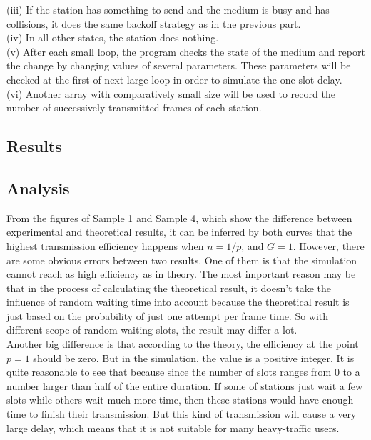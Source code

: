 \documentclass[11pt,a4paper]{report}
\begin{document}
(iii) If the station has something to send and the medium is busy and has collisions, it does the same backoff strategy as in the previous part. \\

(iv) In all other states, the station does nothing. \\

(v) After each small loop, the program checks the state of the medium and report the change by changing values of several parameters. These parameters will be checked at the first of next large loop in order to simulate the one-slot delay. \\

(vi) Another array with comparatively small size will be used to record the number of successively transmitted frames of each station.

\subsection*{Results}

\subsection*{Analysis}

From the figures of Sample 1 and Sample 4, which show the difference between experimental and theoretical results, it can be inferred by both curves that the highest transmission efficiency happens when \(n = 1/p\), and \(G = 1\). However, there are some obvious errors between two results. One of them is that the simulation cannot reach as high efficiency as in theory. The most important reason may be that in the process of calculating the theoretical result, it doesn’t take the influence of random waiting time into account because the theoretical result is just based on the probability of just one attempt per frame time. So with different scope of random waiting slots, the result may differ a lot. \\ 

Another big difference is that according to the theory, the efficiency at the point \(p = 1\) should be zero. But in the simulation, the value is a positive integer. It is quite reasonable to see that because since the number of slots ranges from 0 to a number larger than half of the entire duration. If some of stations just wait a few slots while others wait much more time, then these stations would have enough time to finish their transmission. But this kind of transmission will cause a very large delay, which means that it is not suitable for many heavy-traffic users. \\
\end{document}
